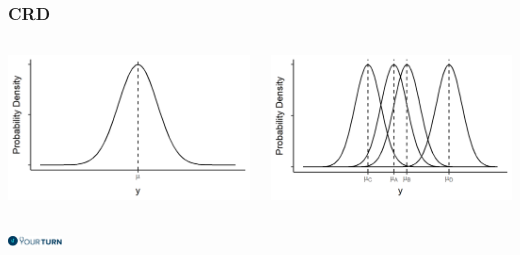 \begin{frame}\frametitle{CRD}
\begin{columns}
\begin{column}{0.5\textwidth}
\centering
\includegraphics[width = \textwidth]{CRDnullNormDensity.png}
\end{column}
\begin{column}{0.5\textwidth}
\centering
\includegraphics[width = \textwidth]{CRDAlternativeNormDensity.png}
\end{column}
\end{columns}


\vspace{1cm}
\flushright
\includegraphics[height = 0.3cm]{yourturn}
\end{frame}


